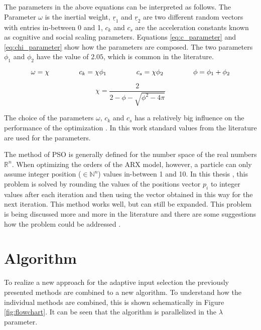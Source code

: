 The parameters in the above equations can be interpreted as follows. The Parameter $\omega$ is the inertial weight, $\underline{r}_1$ and $\underline{r}_2$ are two different random vectors with entries in-between 0 and 1, $c_k$ and $c_s$ are the acceleration constants known as cognitive and social scaling parameters. Equations \ref{eq:c_parameter} and \ref{eq:chi_parameter} show how the parameters are composed. The two parameters $\phi_1$ and $\phi_2$ have the value of $2.05$, which is common in the literature.

 \begin{equation}
	\omega = \chi \hspace{1.5cm} c_k = \chi \phi_1 \hspace{1.5cm} c_s = \chi \phi_2 \hspace{1.5cm} \phi = \phi_1 + \phi_2
	\label{eq:c_parameter}
\end{equation}

 \begin{equation}
	\chi = \dfrac{2}{2-\phi-\sqrt{\phi^2-4\pi}}
	\label{eq:chi_parameter}
\end{equation}

The choice of the parameters $\omega$, $c_k$ and $c_s$ has a relatively big influence on the performance of the optimization \cite{Shi_1998,Taherkhani_2016}. In this work standard values from the literature are used for the parameters.

The method of PSO is generally defined for the number space of the real numbers $\mathbb{R}^n$. When optimizing the orders of the ARX model, however, a particle can only assume integer position ($\in \mathbb{N}^n$) values in-between 1 and 10. In this thesis , this problem is solved by rounding the values of the positions vector $p_i$ to integer values after each iteration and then using the vector obtained in this way for the next iteration. This method works well, but can still be expanded. This problem is being discussed more and more in the literature and there are some suggestions how the problem could be addressed \cite{Kennedy_1997,Lee_2008,Unler_2010}.


\section{Algorithm}
\label{sec:algorithm}

To realize a new approach for the adaptive input selection the previously presented methods are combined to a new algorithm. To understand how the individual methods are combined, this is shown schematically in Figure \ref{fig:flowchart}. It can be seen that the algorithm is parallelized in the $\lambda$ parameter.

